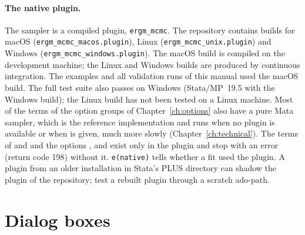 \paragraph{The native plugin.} The sampler is a compiled plugin, \texttt{ergm\_mcmc}. The repository contains builds for macOS (\texttt{ergm\_mcmc\_macos.plugin}), Linux (\texttt{ergm\_mcmc\_unix.plugin}) and Windows (\texttt{ergm\_mcmc\_windows.plugin}). The macOS build is compiled on the development machine; the Linux and Windows builds are produced by continuous integration. The examples and all validation runs of this manual used the macOS build. The full test suite also passes on Windows (Stata/MP~19.5 with the Windows build); the Linux build has not been tested on a Linux machine. Most of the terms of the option groups of Chapter~\ref{ch:options} also have a pure Mata sampler, which is the reference implementation and runs when no plugin is available or when  is given, much more slowly (Chapter~\ref{ch:technical}). The terms of  and  and the options ,  and  exist only in the plugin and stop with an error (return code 198) without it. \texttt{e(native)} tells whether a fit used the plugin. A plugin from an older installation in Stata's PLUS directory can shadow the plugin of the repository; test a rebuilt plugin through a scratch ado-path.

\section{Dialog boxes}

